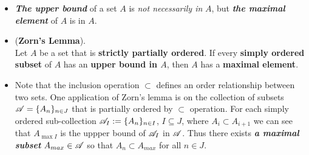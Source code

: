 \documentclass[11pt]{article}
\begin{document}
\begin{itemize}
\item \begin{remark}
\emph{\textbf{The upper bound}} of a set $A$ is \emph{not necessarily in} $A$, but \emph{\textbf{the maximal element}} of $A$ is in $A$. 
\end{remark}

\item \begin{theorem} (\textbf{Zorn's Lemma}). \citep{munkres2000topology} \\
Let $A$ be a set that is \textbf{strictly partially ordered}. If every \textbf{simply ordered subset} of $A$ has an \textbf{upper bound in $A$}, then $A$ has a \textbf{maximal element}.
\end{theorem}

\item \begin{remark}
Note that the inclusion operation $\subset$  defines an order relationship between two sets. One application of Zorn's lemma is on the collection of subsets ${\mathscr A} = \{A_{n}\}_{n \in J}$ that is partially ordered by $\subset$ operation. For each simply ordered sub-collection ${\mathscr A}_{I}:=\{A_{n}\}_{n \in I}$, $I \subseteq J$, where $A_i \subset A_{i+1}$ we can see that $A_{\max{I}}$ is the uppper bound of ${\mathscr A}_{I}$ in ${\mathscr A}$. Thus there exists \emph{\textbf{a maximal subset}} $A_{max} \in {\mathscr A}$ so that $A_n \subset A_{max}$ for all $n \in J$.
\end{remark}
\end{itemize}

\newpage


\end{document}
